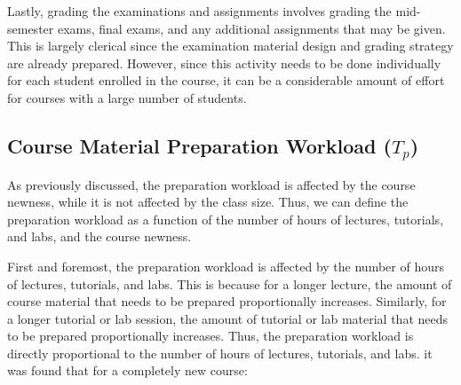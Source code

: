 Lastly, grading the examinations and assignments involves grading the mid-semester exams, final exams, and any additional assignments that may be given. This is largely clerical since the examination material design and grading strategy are already prepared. However, since this activity needs to be done individually for each student enrolled in the course, it can be a considerable amount of effort for courses with a large number of students.

\subsection{Course Material Preparation Workload (\texorpdfstring{\(T_p\)}{})}
\label{sec:preparation_of_course_material}

As previously discussed, the preparation workload is affected by the course newness, while it is not affected by the class size. Thus, we can define the preparation workload as a function of the number of hours of lectures, tutorials, and labs, and the course newness.

First and foremost, the preparation workload is affected by the number of hours of lectures, tutorials, and labs. This is because for a longer lecture, the amount of course material that needs to be prepared proportionally increases. Similarly, for a longer tutorial or lab session, the amount of tutorial or lab material that needs to be prepared proportionally increases. Thus, the preparation workload is directly proportional to the number of hours of lectures, tutorials, and labs. it was found that for a completely new course:

